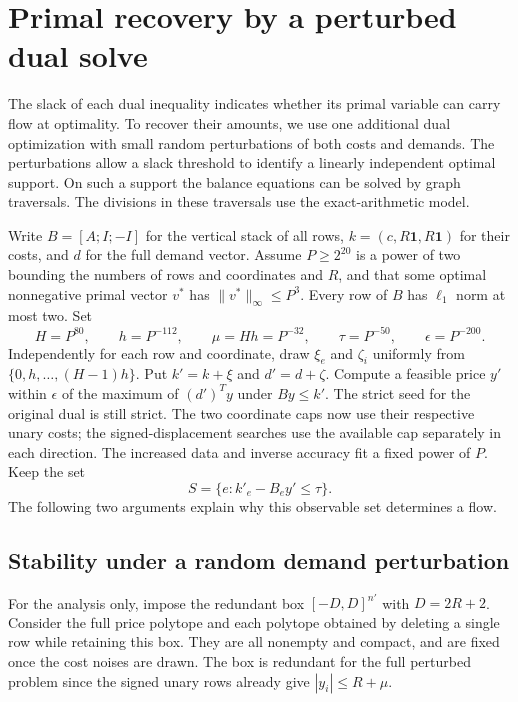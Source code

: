 \documentclass[11pt,letterpaper]{article}
\begin{document}
\section{Primal recovery by a perturbed dual solve}
\label{sec:recovery}

The slack of each dual inequality indicates whether its primal variable can carry flow at optimality.
To recover their amounts, we use one additional dual optimization with
small random perturbations of both costs and demands. The perturbations
allow a slack threshold to identify a linearly independent optimal support.
On such a support the balance equations can be solved by graph traversals.
The divisions in these traversals use the exact-arithmetic model.

Write \(B=[A;I;-I]\) for the vertical stack of all rows, \(k=(c,R\mathbf
1,R\mathbf1)\) for their costs, and \(d\) for the full demand vector.
Assume \(P\ge 2^{20}\) is a power of two bounding the numbers of rows and
coordinates and \(R\), and that some optimal nonnegative primal vector
\(v^*\) has \(\|v^*\|_\infty\le P^3\).
Every row of \(B\) has \(\ell_1\) norm at most two.
Set
\[
 H=P^{80},\qquad h=P^{-112},\qquad \mu=Hh=P^{-32},\qquad
 \tau=P^{-50},\qquad \epsilon=P^{-200}.
\]
Independently for each row and coordinate, draw \(\xi_e\) and \(\zeta_i\)
uniformly from \(\{0,h,\ldots,(H-1)h\}\). Put \(k'=k+\xi\) and
\(d'=d+\zeta\). Compute a feasible price \(y'\) within \(\epsilon\) of
the maximum of \((d')^Ty\) under \(By\le k'\). The strict seed for the
original dual is still strict. The two coordinate caps now use their
respective unary costs; the signed-displacement searches use the available
cap separately in each direction. The increased data and inverse accuracy
fit a fixed power of \(P\). Keep the set
\[
 S=\{e: k'_e-B_e y'\le\tau\}.
\]
The following two arguments explain why this observable set determines a flow.

\subsection{Stability under a random demand perturbation}

For the analysis only, impose the redundant box \([-D,D]^{n'}\) with
\(D=2R+2\). Consider the full price polytope and each polytope obtained
by deleting a single row while retaining this box. They are all nonempty
and compact, and are fixed once the cost noises are drawn. The box is
redundant for the full perturbed problem since the signed unary rows
already give \(|y_i|\le R+\mu\).
\end{document}
